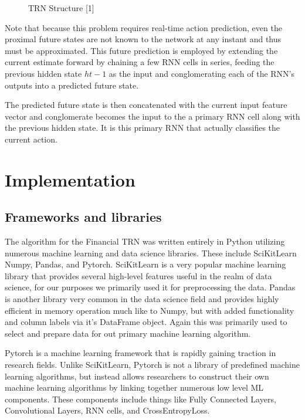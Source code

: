 \documentclass{article}
\begin{document}
    \begin{figure}[H]
      \centering
      \begin{minipage}[b]{0.95	\textwidth}
        \caption{TRN Structure [1]}
      \end{minipage}
    \end{figure}
    
    Note that because this problem requires real-time action prediction, even the proximal future states are not known to the network at any instant and thus must be approximated. This future prediction is employed by extending the current estimate forward by chaining a few RNN cells in series, feeding the previous hidden state $h{t-1}$ as the input and conglomerating each of the RNN’s outputs into a predicted future state.
    
    The predicted future state is then concatenated with the current input feature vector and conglomerate becomes the input to the a primary RNN cell along with the previous hidden state. It is this primary RNN that actually classifies the current action.

\section{Implementation}
    \subsection{Frameworks and libraries}
    The algorithm for the Financial TRN was written entirely in Python utilizing numerous machine learning and data science libraries. These include SciKitLearn Numpy, Pandas, and Pytorch. SciKitLearn is a very popular machine learning library that provides several high-level features useful in the realm of data science, for our purposes we primarily used it for preprocessing the data. Pandas is another library very common in the data science field and provides highly efficient in memory operation much like to Numpy, but with added functionality and column labels via it’s DataFrame object. Again this was primarily used to select and prepare data for out primary machine learning algorithm.
    
    Pytorch is a machine learning framework that is rapidly gaining traction in research fields. Unlike SciKitLearn, Pytorch is not a library of predefined machine learning algorithms, but instead allows researchers to construct their own machine learning algorithms by linking together numerous low level ML components. These components include things like Fully Connected Layers, Convolutional Layers, RNN cells, and CrossEntropyLoss.
    
\end{document}
